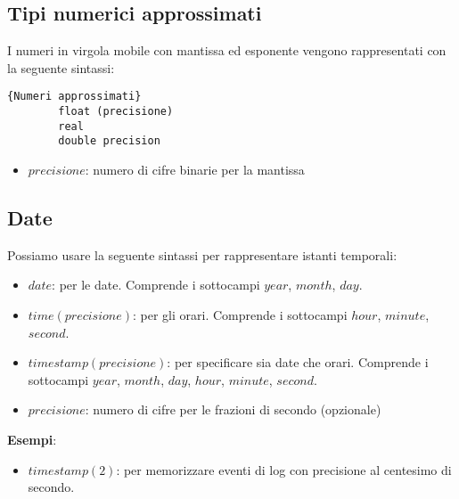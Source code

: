 \subsection{Tipi numerici approssimati}
I numeri in virgola mobile con mantissa ed esponente vengono rappresentati con la seguente sintassi:
    \begin{lstlisting}{Numeri approssimati}
        float (precisione)
        real
        double precision
    \end{lstlisting}
    \begin{itemize}
        \item{$precisione$: numero di cifre binarie per la mantissa}
    \end{itemize}

\subsection{Date}
Possiamo usare la seguente sintassi per rappresentare istanti temporali:
    \begin{itemize}
        \item{$date$: per le date. Comprende i sottocampi $year$, $month$, $day$.}
        \item{$time(precisione)$: per gli orari. Comprende i sottocampi $hour$, $minute$, $second$.}
        \item{$timestamp(precisione)$: per specificare sia date che orari. Comprende i sottocampi $year$, $month$, $day$, $hour$, $minute$, $second$.}
    \end{itemize}
    \begin{itemize}
        \item{$precisione$: numero di cifre per le frazioni di secondo (opzionale)}
    \end{itemize}
\textbf{Esempi}:
    \begin{itemize}
        \item{$timestamp(2)$: per memorizzare eventi di log con precisione al centesimo di secondo.}
    \end{itemize}
    
